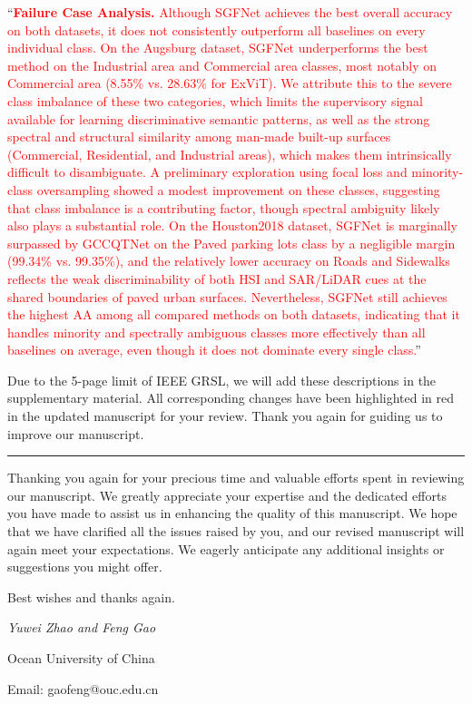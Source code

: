 ``\textcolor{red}{\textbf{Failure Case Analysis.} Although SGFNet achieves the best overall accuracy on both datasets, it does not consistently outperform all baselines on every individual class. On the Augsburg dataset, SGFNet underperforms the best method on the Industrial area and Commercial area classes, most notably on Commercial area (8.55\% vs. 28.63\% for ExViT). We attribute this to the severe class imbalance of these two categories, which limits the supervisory signal available for learning discriminative semantic patterns, as well as the strong spectral and structural similarity among man-made built-up surfaces (Commercial, Residential, and Industrial areas), which makes them intrinsically difficult to disambiguate. A preliminary exploration using focal loss and minority-class oversampling showed a modest improvement on these classes, suggesting that class imbalance is a contributing factor, though spectral ambiguity likely also plays a substantial role. On the Houston2018 dataset, SGFNet is marginally surpassed by GCCQTNet on the Paved parking lots class by a negligible margin (99.34\% vs. 99.35\%), and the relatively lower accuracy on Roads and Sidewalks reflects the weak discriminability of both HSI and SAR/LiDAR cues at the shared boundaries of paved urban surfaces. Nevertheless, SGFNet still achieves the highest AA among all compared methods on both datasets, indicating that it handles minority and spectrally ambiguous classes more effectively than all baselines on average, even though it does not dominate every single class.}''


Due to the 5-page limit of IEEE GRSL, we will add these descriptions in the supplementary material. All corresponding changes have been highlighted in red in the updated manuscript for your review. Thank you again for guiding us to improve our manuscript.


\vspace{2em}

\begin{center}
  \rule[-10pt]{14.3cm}{0.05em}
\end{center}

Thanking you again for your precious time and valuable efforts spent in reviewing our manuscript. We greatly appreciate your expertise and the dedicated efforts you have made to assist us in enhancing the quality of this manuscript. We hope that we have clarified all the issues raised by you, and our revised manuscript will again meet your expectations. We eagerly anticipate any additional insights or suggestions you might offer.

Best wishes and thanks again.

\textit{Yuwei Zhao and Feng Gao}

Ocean University of China

Email: gaofeng@ouc.edu.cn
